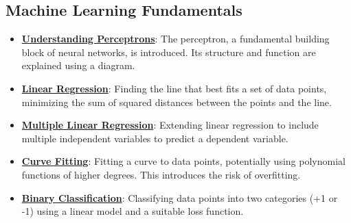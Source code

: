 \documentclass{article}%
\begin{document}
\subsection{Machine Learning Fundamentals}%
\label{subsec:MachineLearningFundamentals}%
\begin{itemize}[leftmargin=*]%
\item \href{\url{https://purdue.brightspace.com/d2l/common/assets/pdfjs-d2l-dist/1.0.14-legacy/web/viewer.html?file=\%252Fcontent\%252Fenforced\%252F1095467-wl.202510.CS.24300.001\%252F04L1-Linear\%20Algebra\%20Primer.pdf\%253Fou\%253D1095467\&lang=en-us\&container=d2l-fileviewer-rendered-pdf\&fullscreen=d2l-fileviewer-rendered-pdf-dialog\&height=667}#page=17}{\textbf{Understanding Perceptrons}}: The perceptron, a fundamental building block of neural networks, is introduced. Its structure and function are explained using a diagram.%
\item \href{\url{https://purdue.brightspace.com/d2l/common/assets/pdfjs-d2l-dist/1.0.14-legacy/web/viewer.html?file=\%252Fcontent\%252Fenforced\%252F1095467-wl.202510.CS.24300.001\%252F05L2-ML\%20Basics.pdf\%253Fou\%253D1095467\&lang=en-us\&container=d2l-fileviewer-rendered-pdf\&fullscreen=d2l-fileviewer-rendered-pdf-dialog\&height=667}#page=6}{\textbf{Linear Regression}}: Finding the line that best fits a set of data points, minimizing the sum of squared distances between the points and the line.%
\item \href{\url{https://purdue.brightspace.com/d2l/common/assets/pdfjs-d2l-dist/1.0.14-legacy/web/viewer.html?file=\%252Fcontent\%252Fenforced\%252F1095467-wl.202510.CS.24300.001\%252F05L2-ML\%20Basics.pdf\%253Fou\%253D1095467\&lang=en-us\&container=d2l-fileviewer-rendered-pdf\&fullscreen=d2l-fileviewer-rendered-pdf-dialog\&height=667}#page=11}{\textbf{Multiple Linear Regression}}: Extending linear regression to include multiple independent variables to predict a dependent variable.%
\item \href{\url{https://purdue.brightspace.com/d2l/common/assets/pdfjs-d2l-dist/1.0.14-legacy/web/viewer.html?file=\%252Fcontent\%252Fenforced\%252F1095467-wl.202510.CS.24300.001\%252F05L2-ML\%20Basics.pdf\%253Fou\%253D1095467\&lang=en-us\&container=d2l-fileviewer-rendered-pdf\&fullscreen=d2l-fileviewer-rendered-pdf-dialog\&height=667}#page=13}{\textbf{Curve Fitting}}: Fitting a curve to data points, potentially using polynomial functions of higher degrees. This introduces the risk of overfitting.%
\item \href{\url{https://purdue.brightspace.com/d2l/common/assets/pdfjs-d2l-dist/1.0.14-legacy/web/viewer.html?file=\%252Fcontent\%252Fenforced\%252F1095467-wl.202510.CS.24300.001\%252F05L2-ML\%20Basics.pdf\%253Fou\%253D1095467\&lang=en-us\&container=d2l-fileviewer-rendered-pdf\&fullscreen=d2l-fileviewer-rendered-pdf-dialog\&height=667}#page=20}{\textbf{Binary Classification}}: Classifying data points into two categories (+1 or -1) using a linear model and a suitable loss function.%
\end{itemize}
\end{document}
